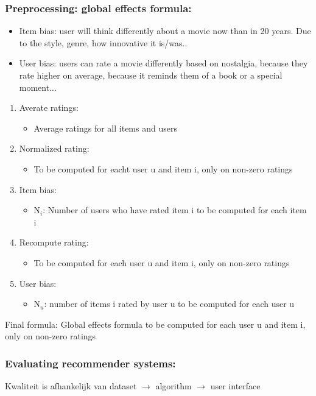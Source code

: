 \documentclass[12pt]{article}
\begin{document}
\subsubsection{Preprocessing: global effects formula:}
\begin{itemize}
    \item Item bias: user will think differently about a movie now than in 20 years. Due to the style, genre, how innovative it is/was.. 
    \item User bias: users can rate a movie differently based on nostalgia, because they rate higher on average, because it reminds them of a book or a special moment... 
\end{itemize}
\begin{enumerate}
    \item Averate ratings:\begin{itemize}
        \item Average ratings for all items and users
    \end{itemize}
    \item Normalized rating:\begin{itemize}
        \item To be computed for eacht user u and item i, only on non-zero ratings
    \end{itemize}
    \item Item bias:\begin{itemize}
        \item N$_i$: Number of users who have rated item i to be computed for each item i
    \end{itemize}
    \item Recompute rating:\begin{itemize}
        \item To be computed for each user u and item i, only on non-zero ratings
    \end{itemize}
    \item User bias:\begin{itemize}
        \item N$_u$: number of items i rated by user u to be computed for each user u
    \end{itemize}
\end{enumerate}
Final formula: Global effects formula to be computed for each user u and item i, only on non-zero ratings
\subsubsection{Evaluating recommender systems:}
Kwaliteit is afhankelijk van dataset $\rightarrow$ algorithm $\rightarrow$ user interface
\end{document}
